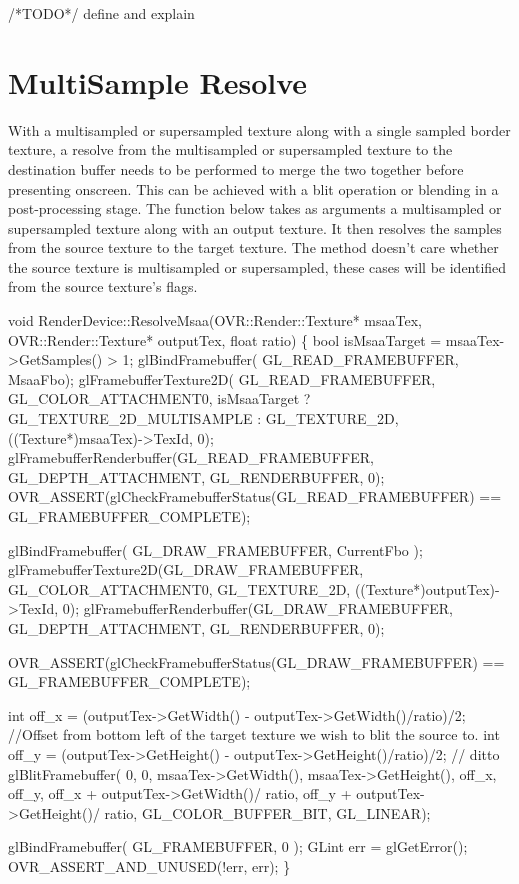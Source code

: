 \documentclass[12pt,a4paper,twoside,openright]{report}
\begin{document}
\begin{blockcode}

\end{blockcode}
/*TODO*/ define and explain


\section{MultiSample Resolve}

With a multisampled or supersampled texture along with a single sampled border texture, a resolve from the multisampled or supersampled texture to the destination buffer needs to be performed to merge the two together before presenting onscreen. This can be achieved with a blit operation or blending in a post-processing stage.
The function below takes as arguments a multisampled or supersampled texture along with an output texture. It then resolves the samples from the source texture to the target texture. The method doesn't care whether the source texture is multisampled or supersampled, these cases will be identified from the source texture's flags.

\begin{blockcode}[commandchars=\\\{\}, numbers=left]
void RenderDevice::ResolveMsaa(OVR::Render::Texture* msaaTex, OVR::Render::Texture* outputTex, float ratio)
\{
    bool isMsaaTarget = msaaTex->GetSamples() > 1;
    glBindFramebuffer( GL_READ_FRAMEBUFFER, MsaaFbo);
    glFramebufferTexture2D( GL_READ_FRAMEBUFFER, GL_COLOR_ATTACHMENT0,
                            isMsaaTarget ? GL_TEXTURE_2D_MULTISAMPLE : GL_TEXTURE_2D,
                            ((Texture*)msaaTex)->TexId, 0);
    glFramebufferRenderbuffer(GL_READ_FRAMEBUFFER, GL_DEPTH_ATTACHMENT, GL_RENDERBUFFER, 0);
    OVR_ASSERT(glCheckFramebufferStatus(GL_READ_FRAMEBUFFER) == GL_FRAMEBUFFER_COMPLETE);

    glBindFramebuffer( GL_DRAW_FRAMEBUFFER, CurrentFbo );
    glFramebufferTexture2D(GL_DRAW_FRAMEBUFFER, GL_COLOR_ATTACHMENT0, GL_TEXTURE_2D, ((Texture*)outputTex)->TexId, 0);
    glFramebufferRenderbuffer(GL_DRAW_FRAMEBUFFER, GL_DEPTH_ATTACHMENT, GL_RENDERBUFFER, 0);

    OVR_ASSERT(glCheckFramebufferStatus(GL_DRAW_FRAMEBUFFER) == GL_FRAMEBUFFER_COMPLETE);

\color{green}    int off_x = (outputTex->GetWidth() - outputTex->GetWidth()/ratio)/2; //Offset from bottom left of the target texture we wish to blit the source to. 
\color{green}    int off_y = (outputTex->GetHeight() - outputTex->GetHeight()/ratio)/2; // ditto
\color{green}    glBlitFramebuffer( 0, 0, msaaTex->GetWidth(), msaaTex->GetHeight(), off_x, off_y,
\color{green}                             off_x + outputTex->GetWidth()/ ratio,
\color{green}                             off_y + outputTex->GetHeight()/ ratio,
\color{green}                             GL_COLOR_BUFFER_BIT, GL_LINEAR);

    glBindFramebuffer( GL_FRAMEBUFFER, 0 );  
    GLint err = glGetError();
    OVR_ASSERT_AND_UNUSED(!err, err);
\}
\end{blockcode}
\end{document}
